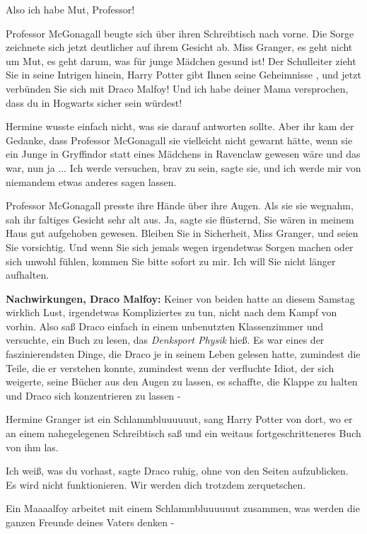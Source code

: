 \glqq{}Also ich habe Mut, Professor!\grqq{}

Professor McGonagall beugte sich über ihren Schreibtisch nach vorne. Die Sorge
zeichnete sich jetzt deutlicher auf ihrem Gesicht ab. \glqq{}Miss Granger, es
geht nicht um Mut, es geht darum, was für junge Mädchen gesund ist! Der
Schulleiter zieht Sie in seine Intrigen hinein, Harry Potter gibt Ihnen seine
Geheimnisse , und jetzt verbünden Sie sich mit Draco Malfoy! Und ich habe deiner
Mama versprochen, dass du in Hogwarts sicher sein würdest!\grqq{}

Hermine wusste einfach nicht, was sie darauf antworten sollte. Aber ihr kam der
Gedanke, dass Professor McGonagall sie vielleicht nicht gewarnt hätte, wenn sie
ein Junge in Gryffindor statt eines Mädchens in Ravenclaw gewesen wäre und das
war, nun ja ... \glqq{}Ich werde versuchen, brav zu sein\grqq{}, sagte sie, \glqq{}
und ich werde mir von niemandem etwas anderes sagen lassen.\grqq{}

Professor McGonagall presste ihre Hände über ihre Augen. Als sie sie wegnahm,
sah ihr faltiges Gesicht sehr alt aus. \glqq{}Ja\grqq{}, sagte sie flüsternd,
\glqq{}Sie wären in meinem Haus gut aufgehoben gewesen. Bleiben Sie in
Sicherheit, Miss Granger, und seien Sie vorsichtig. Und wenn Sie sich jemals
wegen irgendetwas Sorgen machen oder sich unwohl fühlen, kommen Sie bitte sofort
zu mir. Ich will Sie nicht länger aufhalten.\grqq{}

\textbf{Nachwirkungen, Draco Malfoy:}
Keiner von beiden hatte an diesem Samstag wirklich Lust, irgendetwas
Kompliziertes zu tun, nicht nach dem Kampf von vorhin. Also saß Draco einfach in
einem unbenutzten Klassenzimmer und versuchte, ein Buch zu lesen, das
\emph{\glqq{}Denksport Physik\grqq{}} hieß. Es war eines der faszinierendsten
Dinge, die Draco je in seinem Leben gelesen hatte, zumindest die Teile, die er
verstehen konnte, zumindest wenn der verfluchte Idiot, der sich weigerte, seine
Bücher aus den Augen zu lassen, es schaffte, die Klappe zu halten und Draco sich
konzentrieren zu lassen -

\glqq{}Hermine Granger ist ein Schlammbluuuuuut\grqq{}, sang Harry Potter von
dort, wo er an einem nahegelegenen Schreibtisch saß und ein weitaus
fortgeschritteneres Buch von ihm las.

\glqq{}Ich weiß, was du vorhast\grqq{}, sagte Draco ruhig, ohne von den Seiten
aufzublicken. \glqq{}Es wird nicht funktionieren. Wir werden dich trotzdem
zerquetschen.\grqq{}

\glqq{}Ein Maaaalfoy arbeitet mit einem Schlammbluuuuuut zusammen, was werden die
ganzen Freunde deines Vaters denken -\grqq{}

